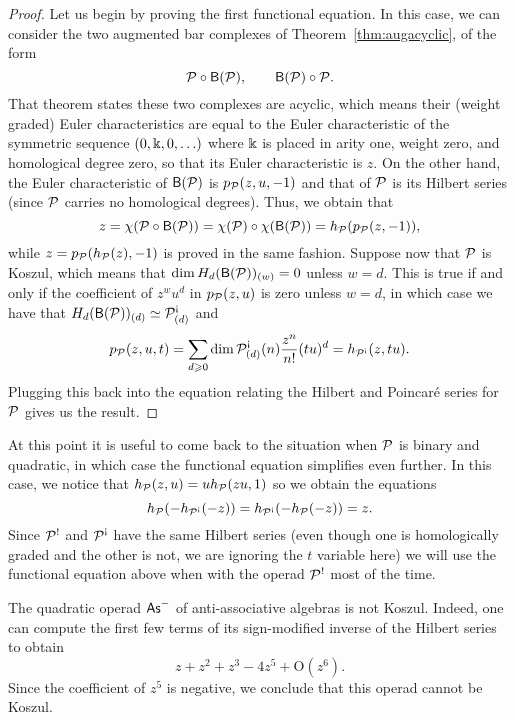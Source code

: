 \begin{proof}
Let us begin by proving the first functional equation. In this case,
we can consider the two augmented bar complexes of Theorem~\ref{thm:augacyclic},
of the form
\[
{\mathcal{P}}\circ\mathsf{B}({\mathcal{P}}),\qquad \mathsf{B}({\mathcal{P}})\circ{\mathcal{P}}. 
\]
That theorem states these two complexes are acyclic, which means their
(weight graded) Euler characteristics are equal to the Euler characteristic 
of the symmetric sequence $(0,\Bbbk,0,\ldots)$ where $\Bbbk$ is placed in arity one,
weight zero, and homological degree zero, so that its Euler characteristic is
$z$. On the other hand, the Euler characteristic of $\mathsf{B}({\mathcal{P}})$ is
$p_{\mathcal{P}}(z,u,-1)$ and that of ${\mathcal{P}}$ is its Hilbert series (since ${\mathcal{P}}$ carries no
homological degrees). Thus, we obtain that 
\[
z = \chi({\mathcal{P}}\circ\mathsf{B}({\mathcal{P}})) = \chi({\mathcal{P}})\circ \chi(\mathsf{B}({\mathcal{P}})) = 
		h_{\mathcal{P}}(p_{\mathcal{P}}(z,-1)),
\]
while $z = p_{\mathcal{P}}(h_{\mathcal{P}}(z),-1)$ is proved in the same fashion. Suppose
now that ${\mathcal{P}}$ is Koszul, which means that $\dim H_d(\mathsf{B}({\mathcal{P}}))_{(w)} = 0$
unless $w=d$. This is true if and only if the coefficient of $z^wu^d$ in
$p_{\mathcal{P}}(z,u)$ is zero unless $w=d$, in which case we have that
$H_d(\B{\PP})_{(d)} \simeq  \PP^\antishriek_{(d)}$ and
\[
p_\PP(z,u,t) = \sum_{d\geqslant 0} \dim \PP^\antishriek_{(d)}(n) 
	\frac{z^n}{n!} (tu)^d = h_{\PP^\antishriek}(z,tu).
\]
Plugging this back into the equation relating the Hilbert and Poincar\'e
series for ${\mathcal{P}}$ gives us the result.
\end{proof}

At this point it is useful to come back to the situation when ${\mathcal{P}}$
is binary and quadratic, in which case the functional equation
simplifies even further. In this case, we notice that
$h_{\mathcal{P}}(z,u) = u h_{\mathcal{P}}(zu,1)$ so we obtain the equations  
\[
h_\PP(-h_{\PP^\antishriek}(-z)) = h_{\PP^\antishriek}(-h_\PP(-z)) = z. 
\]
Since ${\mathcal{P}}^!$ and $\PP^\antishriek$ have the same Hilbert series (even
though one is homologically graded and the other is not, we are
ignoring the $t$ variable here) we will use the functional equation above
when with the operad ${\mathcal{P}}^!$ most of the time.



\begin{example}
The quadratic operad $\mathsf{As}^-$ of anti-associative algebras is not Koszul.
Indeed, one can compute the first few terms of its sign-modified inverse of the 
Hilbert series to obtain
\[
z + z^2 + z^3  - 4 z^5 + \textrm{O}(z^{6}).
\]
Since the coefficient of $z^{5}$ is negative, we conclude that this operad cannot be Koszul. 
\end{example}

